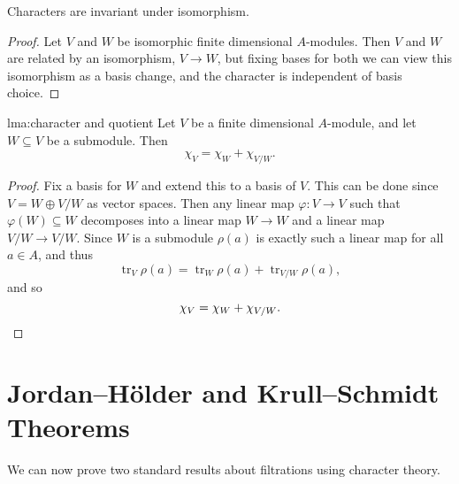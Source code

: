 \documentclass[fleqn]{NotesClass}
\DeclareMathOperator{\tr}{tr}
\begin{document}
    \begin{lma}{}{}
        Characters are invariant under isomorphism.
        \begin{proof}
            Let \(V\) and \(W\) be isomorphic finite dimensional \(A\)-modules.
            Then \(V\) and \(W\) are related by an isomorphism, \(V \to W\), but fixing bases for both we can view this isomorphism as a basis change, and the character is independent of basis choice.
        \end{proof}
    \end{lma}
    
    \begin{lma}{}{lma:character and quotient}
        Let \(V\) be a finite dimensional \(A\)-module, and let \(W \subseteq V\) be a submodule.
        Then
        \begin{equation}
            \chi_V = \chi_W + \chi_{V/W}.
        \end{equation}
        \begin{proof}
            Fix a basis for \(W\) and extend this to a basis of \(V\).
            This can be done since \(V = W \oplus V/W\) as vector spaces.
            Then any linear map \(\varphi \colon V \to V\) such that \(\varphi(W) \subseteq W\) decomposes into a linear map \(W \to W\) and a linear map \(V/W \to V/W\).
            Since \(W\) is a submodule \(\rho(a)\) is exactly such a linear map for all \(a \in A\), and thus
            \begin{equation}
                \tr_V \rho(a) = \tr_W \rho(a) + \tr_{V/W} \rho(a),
            \end{equation}
            and so
            \begin{equation*}
                \chi_V = \chi_W + \chi_{V/W}. \qedhere
            \end{equation*}
        \end{proof}
    \end{lma}
    
    \section{Jordan--H\"older and Krull--Schmidt Theorems}
    We can now prove two standard results about filtrations using character theory.
    
\end{document}
